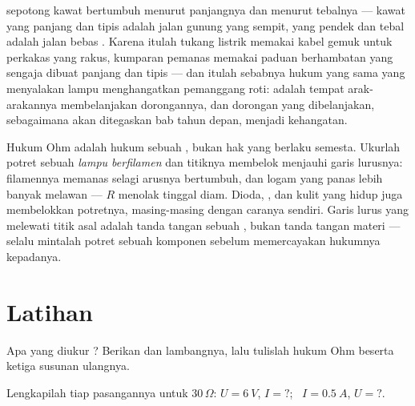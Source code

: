 \begin{example}\label{ex:g8:ohms-law:wires}
 sepotong kawat bertumbuh menurut panjangnya dan 
menurut tebalnya --- kawat yang panjang dan tipis adalah jalan gunung
yang sempit, yang pendek dan tebal adalah jalan bebas . Karena
itulah tukang listrik memakai kabel gemuk untuk perkakas yang rakus,
kumparan pemanas memakai paduan berhambatan yang sengaja dibuat panjang
dan tipis --- dan itulah sebabnya hukum yang sama yang menyalakan
lampu menghangatkan pemanggang roti:  adalah tempat
arak-arakannya membelanjakan dorongannya, dan dorongan yang
dibelanjakan, sebagaimana akan ditegaskan bab  tahun depan,
menjadi kehangatan.
\end{example}

\begin{remark}\label{rem:g8:ohms-law:limits}
Hukum Ohm adalah hukum sebuah , bukan hak yang berlaku
semesta. Ukurlah potret sebuah \emph{lampu berfilamen} dan titiknya
membelok menjauhi garis lurusnya: filamennya memanas selagi arusnya
bertumbuh, dan logam yang panas lebih banyak melawan --- $R$ menolak
tinggal diam. Dioda, , dan kulit yang hidup juga membelokkan
potretnya, masing-masing dengan caranya sendiri. Garis lurus yang
melewati titik asal adalah tanda tangan sebuah , bukan tanda
tangan materi --- selalu mintalah potret sebuah komponen sebelum
memercayakan hukumnya kepadanya.
\end{remark}

\section{Latihan}

\begin{exercise}[$\star$]\label{exo:g8:ohms-law:1}
Apa yang diukur ? Berikan  dan lambangnya, lalu tulislah
hukum Ohm beserta ketiga susunan ulangnya.
\end{exercise}

\begin{exercise}[$\star$]\label{exo:g8:ohms-law:2}
Lengkapilah tiap pasangannya untuk  $30\,\Omega$: $U =
\qty{6}{V}$, $I = {?}$; \ $I = \qty{0.5}{A}$, $U = {?}$.
\end{exercise}

